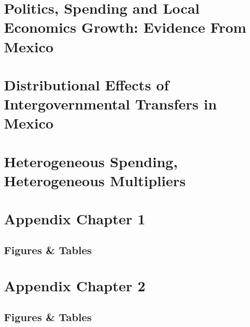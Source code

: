 \documentclass[12pt]{report}
\begin{document}
\chapter{Politics, Spending and Local Economics Growth:
Evidence From Mexico}\label{chap:c1}


\label{sec:context}
\label{sec:identification}
\label{sec:data}
\label{sec:validity}
\label{sec:results}

\label{sec:channels}
\label{sec:channels}
\label{sec:channels}



\chapter{Distributional Effects of Intergovernmental Transfers in Mexico}\label{chap:c2}



\chapter{Heterogeneous Spending, Heterogeneous Multipliers}\label{chap:c3}





\appendixtocoff
\appendices

\chapter{Appendix Chapter 1}
\section{Figures \& Tables}
\label{FirstAppendixC1}
\label{SecondAppendixC1}

\chapter{Appendix Chapter 2}
\section{Figures \& Tables}
\label{FirstAppendixC2}
\label{SecondAppendixC2}
\end{document}
